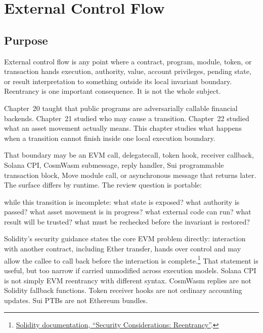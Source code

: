 \chapter{External Control Flow}

\section{Purpose}

\begin{principlebox}
External control flow is any point where a contract, program, module, token, or transaction hands execution, authority, value, account privileges, pending state, or result interpretation to something outside its local invariant boundary. Reentrancy is one important consequence. It is not the whole subject.
\end{principlebox}

Chapter~20 taught that public programs are adversarially callable financial backends. Chapter~21 studied who may cause a transition. Chapter~22 studied what an asset movement actually means. This chapter studies what happens when a transition cannot finish inside one local execution boundary.

That boundary may be an EVM call, delegatecall, token hook, receiver callback, Solana CPI, CosmWasm submessage, reply handler, Sui programmable transaction block, Move module call, or asynchronous message that returns later. The surface differs by runtime. The review question is portable:

\begin{codeblock}
while this transition is incomplete:
    what state is exposed?
    what authority is passed?
    what asset movement is in progress?
    what external code can run?
    what result will be trusted?
    what must be rechecked before the invariant is restored?
\end{codeblock}

Solidity's security guidance states the core EVM problem directly: interaction with another contract, including Ether transfer, hands over control and may allow the callee to call back before the interaction is complete.\footnote{\href{https://docs.soliditylang.org/en/latest/security-considerations.html\#reentrancy}{Solidity documentation, ``Security Considerations: Reentrancy''}.} That statement is useful, but too narrow if carried unmodified across execution models. Solana CPI is not simply EVM reentrancy with different syntax. CosmWasm replies are not Solidity fallback functions. Token receiver hooks are not ordinary accounting updates. Sui PTBs are not Ethereum bundles.

